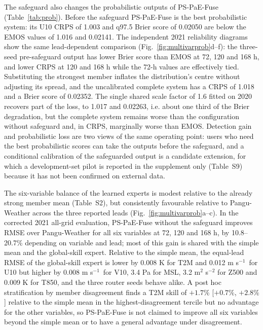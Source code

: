 \documentclass[12pt]{article}
\newcommand{\mps}{m s$^{-1}$}
\begin{document}
The safeguard also changes the probabilistic outputs of PS-PaE-Fuse (Table~\ref{tab:prob}). Before the safeguard PS-PaE-Fuse is the best probabilistic system: its U10 CRPS of 1.003 and q97.5 Brier score of 0.02050 are below the EMOS values of 1.016 and 0.02141. The independent 2021 reliability diagrams show the same lead-dependent comparison (Fig.~\ref{fig:multivarprob}d--f): the three-seed pre-safeguard output has lower Brier score than EMOS at 72, 120 and 168 h, and lower CRPS at 120 and 168 h while the 72-h values are effectively tied. Substituting the strongest member inflates the distribution's centre without adjusting its spread, and the uncalibrated complete system has a CRPS of 1.018 and a Brier score of 0.02352. The single shared scale factor of 1.6 fitted on 2020 recovers part of the loss, to 1.017 and 0.02263, i.e. about one third of the Brier degradation, but the complete system remains worse than the configuration without safeguard and, in CRPS, marginally worse than EMOS. Detection gain and probabilistic loss are two views of the same operating point: users who need the best probabilistic scores can take the outputs before the safeguard, and a conditional calibration of the safeguarded output is a candidate extension, for which a development-set pilot is reported in the supplement only (Table~S9) because it has not been confirmed on external data.

The six-variable balance of the learned experts is modest relative to the already strong member mean (Table~S2), but consistently favourable relative to Pangu-Weather across the three reported leads (Fig.~\ref{fig:multivarprob}a--c). In the corrected 2021 all-grid evaluation, PS-PaE-Fuse without the safeguard improves RMSE over Pangu-Weather for all six variables at 72, 120 and 168 h, by 10.8--20.7\% depending on variable and lead; most of this gain is shared with the simple mean and the global-skill expert. Relative to the simple mean, the equal-lead RMSE of the global-skill expert is lower by 0.008 K for T2M and 0.012 \mps\ for U10 but higher by 0.008 \mps\ for V10, 3.4 Pa for MSL, 3.2 m$^{2}$ s$^{-2}$ for Z500 and 0.009 K for T850, and the three router seeds behave alike. A post hoc stratification by member disagreement finds a T2M skill of $+1.7\%$ [$+0.7\%$, $+2.8\%$] relative to the simple mean in the highest-disagreement tercile but no advantage for the other variables, so PS-PaE-Fuse is not claimed to improve all six variables beyond the simple mean or to have a general advantage under disagreement.
\end{document}
